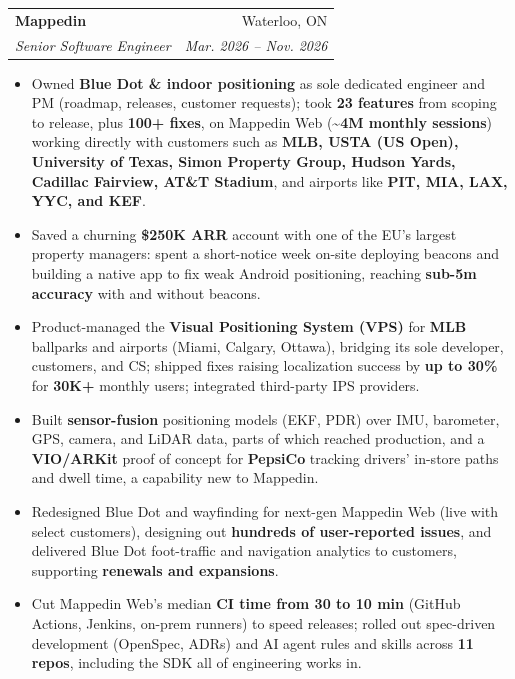 \documentclass[standalone,9pt]{extarticle}
\makeatletter
\newcommand{\rowwidth}{0.97\textwidth}
\newcommand{\resumeItemListStart}{\begin{itemize}}
\newcommand{\resumeItemListEnd}{\end{itemize}\vspace{2.5pt}}
\newcommand{\resumeItem}[1]{
    \item \small{
        {#1 \vspace{-2pt}}
    }
}
\newcommand{\resumeSubheading}[4]{
    \vspace{-2pt}
    \item
    \begin{tabular*}{\rowwidth}[t]{l@{\extracolsep{\fill}}r}
        \textbf{#1} & #2 \\
        \textit{\small#3} & \textit{\small #4} \\
    \end{tabular*}
    \vspace{-6pt}
}
\makeatother
\begin{document}
        \resumeSubheading
            {Mappedin}{Waterloo, ON}
            {Senior Software Engineer}{Mar. 2026 -- Nov. 2026}
        \resumeItemListStart
            \resumeItem{Owned \textbf{Blue Dot \& indoor positioning} as sole dedicated engineer and PM (roadmap, releases, customer requests); took \textbf{23 features} from scoping to release, plus \textbf{100+ fixes}, on Mappedin Web (\textbf{\textasciitilde4M monthly sessions}) working directly with customers such as \textbf{MLB, USTA (US Open), University of Texas, Simon Property Group, Hudson Yards, Cadillac Fairview, AT\&T Stadium}, and airports like \textbf{PIT, MIA, LAX, YYC, and KEF}.}
            \resumeItem{Saved a churning \textbf{\$250K ARR} account with one of the EU's largest property managers: spent a short-notice week on-site deploying beacons and building a native app to fix weak Android positioning, reaching \textbf{sub-5m accuracy} with and without beacons.}
            \resumeItem{Product-managed the \textbf{Visual Positioning System (VPS)} for \textbf{MLB} ballparks and airports (Miami, Calgary, Ottawa), bridging its sole developer, customers, and CS; shipped fixes raising localization success by \textbf{up to 30\%} for \textbf{30K+} monthly users; integrated third-party IPS providers.}
            \resumeItem{Built \textbf{sensor-fusion} positioning models (EKF, PDR) over IMU, barometer, GPS, camera, and LiDAR data, parts of which reached production, and a \textbf{VIO/ARKit} proof of concept for \textbf{PepsiCo} tracking drivers' in-store paths and dwell time, a capability new to Mappedin.}
            \resumeItem{Redesigned Blue Dot and wayfinding for next-gen Mappedin Web (live with select customers), designing out \textbf{hundreds of user-reported issues}, and delivered Blue Dot foot-traffic and navigation analytics to customers, supporting \textbf{renewals and expansions}.}
            \resumeItem{Cut Mappedin Web's median \textbf{CI time from 30 to 10 min} (GitHub Actions, Jenkins, on-prem runners) to speed releases; rolled out spec-driven development (OpenSpec, ADRs) and AI agent rules and skills across \textbf{11 repos}, including the SDK all of engineering works in.}
        \resumeItemListEnd
\end{document}
